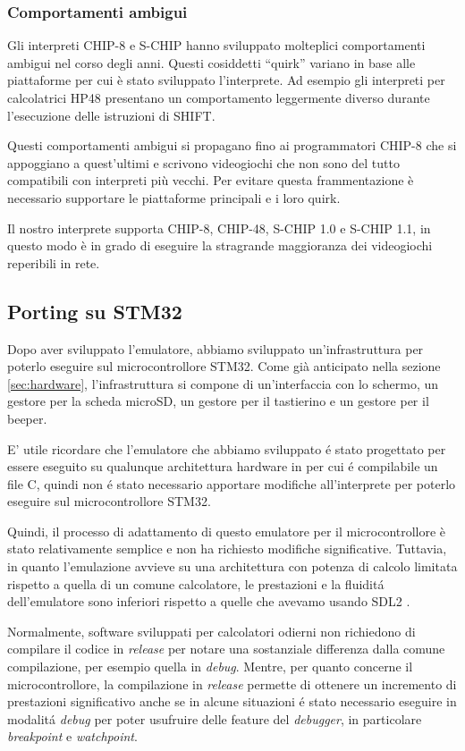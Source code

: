 \documentclass[a4paper]{article}
\begin{document}
\subsubsection{Comportamenti ambigui}

Gli interpreti CHIP-8 e S-CHIP hanno sviluppato molteplici comportamenti ambigui nel corso degli anni. Questi cosiddetti ``quirk'' variano in base alle piattaforme per cui è stato sviluppato l'interprete. Ad esempio gli interpreti per calcolatrici HP48 presentano un comportamento leggermente diverso durante l'esecuzione delle istruzioni di SHIFT.

Questi comportamenti ambigui si propagano fino ai programmatori
CHIP-8 che si appoggiano a quest'ultimi e scrivono videogiochi che
non sono del tutto compatibili con interpreti più vecchi. Per evitare
questa frammentazione è necessario supportare le piattaforme
principali e i loro quirk.

Il nostro interprete supporta CHIP-8, CHIP-48, S-CHIP 1.0 e
S-CHIP 1.1, in questo modo è in grado di eseguire la stragrande
maggioranza dei videogiochi reperibili in rete.

\subsection{Porting su STM32}

Dopo aver sviluppato l'emulatore, abbiamo sviluppato un'infrastruttura per poterlo eseguire sul microcontrollore STM32.
Come già anticipato nella sezione \ref{sec:hardware}, l'infrastruttura si compone di un'interfaccia con lo schermo, un gestore per la scheda microSD, un gestore per il tastierino e un gestore per il beeper.

E' utile ricordare che l'emulatore che abbiamo sviluppato é stato progettato per essere eseguito su qualunque architettura hardware in per cui é compilabile un file C, quindi non é stato necessario apportare modifiche all'interprete per poterlo eseguire sul microcontrollore STM32.

Quindi, il processo di adattamento di questo emulatore per il microcontrollore è stato relativamente semplice e non ha richiesto modifiche significative. Tuttavia, in quanto l'emulazione avvieve su una architettura con potenza di calcolo limitata rispetto a quella di un comune calcolatore, le prestazioni e la fluiditá dell'emulatore sono inferiori rispetto a quelle che avevamo usando SDL2 \cite{libsdl:about}.

Normalmente, software sviluppati per calcolatori odierni non richiedono di compilare il codice in \textit{release} per notare una sostanziale differenza dalla comune compilazione, per esempio quella in \textit{debug}. Mentre, per quanto concerne il microcontrollore, la compilazione in \textit{release} permette di ottenere un incremento di prestazioni significativo anche se in alcune situazioni \'e stato necessario eseguire in modalit\'a \textit{debug} per poter usufruire delle feature del \textit{debugger}, in particolare \textit{breakpoint} e \textit{watchpoint}.
\end{document}
